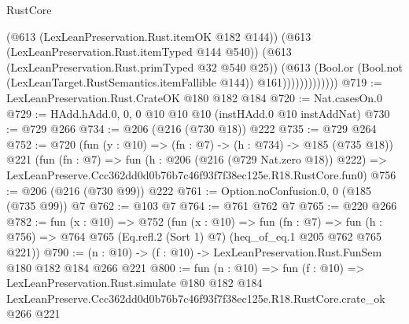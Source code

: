 \begin{lexlean}{RustCore}
\begin{coremodule}
                          (@613 (LexLeanPreservation.Rust.itemOK @182 @144))
                          (@613 (LexLeanPreservation.Rust.itemTyped @144 @540))
                          (@613 (LexLeanPreservation.Rust.primTyped @32 @540 @25))
                          (@613
                            (Bool.or
                              (Bool.not (LexLeanTarget.RustSemantics.itemFallible @144))
                              @161)))))))))))))
@719 := LexLeanPreservation.Rust.CrateOK @180 @182 @184
@720 := Nat.casesOn.{0}
@729 := HAdd.hAdd.{0, 0, 0} @10 @10 @10 (instHAdd.{0} @10 instAddNat)
@730 := @729 @266
@734 := @206 (@216 (@730 @18)) @222
@735 := @729 @264
@752 := @720
    (fun (y : @10) => (fn : @7) -> (h : @734) -> @185 (@735 @18))
    @221
    (fun (fn : @7) =>
    fun (h : @206 (@216 (@729 Nat.zero @18)) @222) =>
    LexLeanPreserve.Ccc362dd0d0b76b7c46f93f7f38ec125e.R18.RustCore.fun0)
@756 := @206 (@216 (@730 @99)) @222
@761 := Option.noConfusion.{0, 0} (@185 (@735 @99)) @7
@762 := @103 @7
@764 := @761 @762 @7
@765 := @220 @266
@782 := fun (x : @10) =>
  @752
    (fun (x : @10) =>
    fun (fn : @7) =>
    fun (h : @756) => @764 @765 (Eq.refl.{2} (Sort 1) @7) (heq_of_eq.{1} @205 @762 @765 @221))
@790 := (n : @10) -> (f : @10) -> LexLeanPreservation.Rust.FunSem @180 @182 @184 @266 @221
@800 := fun (n : @10) =>
  fun (f : @10) =>
  LexLeanPreservation.Rust.simulate
    @180
    @182
    @184
    LexLeanPreserve.Ccc362dd0d0b76b7c46f93f7f38ec125e.R18.RustCore.crate_ok
    @266
    @221
\end{coremodule}
\end{lexlean}
